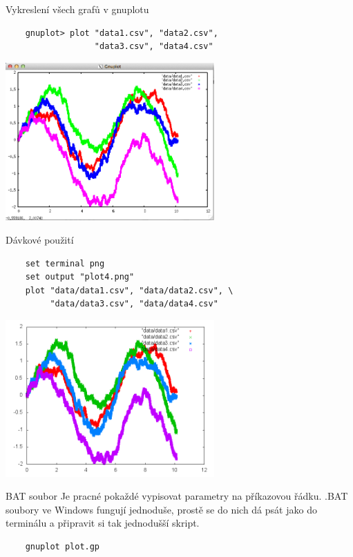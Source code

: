 \documentclass{beamer}
\begin{document}
\begin{frame}[fragile]{Vykreslení všech grafů v gnuplotu}
  \begin{verbatim}
    gnuplot> plot "data1.csv", "data2.csv", 
                  "data3.csv", "data4.csv"
  \end{verbatim}
  \pause
  \begin{center}
    \includegraphics[width=0.6\textwidth]{gnuplot_interactive_all}  
  \end{center}
\end{frame}

\begin{frame}[fragile]{Dávkové použití}
  \scriptsize
  \begin{verbatim}
    set terminal png
    set output "plot4.png"
    plot "data/data1.csv", "data/data2.csv", \
         "data/data3.csv", "data/data4.csv"
  \end{verbatim}
  \pause 
  \begin{center}
    \includegraphics[width=0.6\textwidth]{../gnuplot/plot4}  
  \end{center}
\end{frame}

\begin{frame}[fragile]{BAT soubor}
  Je pracné pokaždé vypisovat parametry na příkazovou řádku. .BAT soubory ve Windows fungují jednoduše, prostě se do nich dá psát jako do terminálu a připravit si tak jednodušší skript.
  \begin{verbatim}
    gnuplot plot.gp
  \end{verbatim}
\end{frame}
\end{document}
